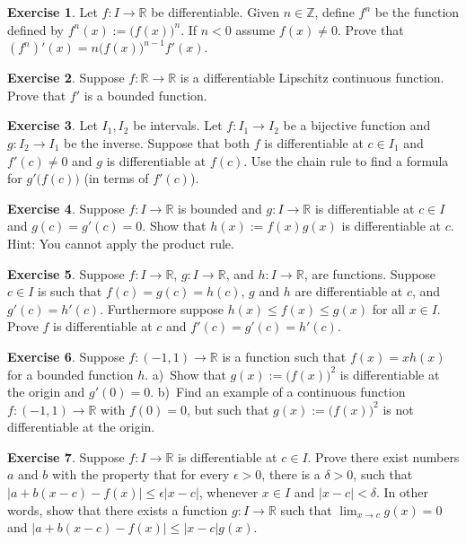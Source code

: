 \documentclass[12pt]{book}
\newcommand{\abs}[1]{\left\lvert {#1} \right\rvert}
\newcommand{\R}{{\mathbb{R}}}
\newcommand{\Z}{{\mathbb{Z}}}
\theoremstyle{plain}
\theoremstyle{remark}
\theoremstyle{definition}
\theoremstyle{exercise}
\newtheorem{exercise}{Exercise}[section]
\theoremstyle{example}
\begin{document}
\begin{exercise}
Let $f \colon I \to \R$ be differentiable.  Given $n \in \Z$, define $f^n$
be the function defined by $f^n(x) := {\bigl( f(x) \bigr)}^n$.  If
$n < 0$ assume $f(x) \not= 0$.  Prove that
$(f^n)'(x) = n {\bigl(f(x) \bigr)}^{n-1} f'(x)$.
\end{exercise}

\begin{exercise}
Suppose $f \colon \R \to \R$ is a differentiable
Lipschitz continuous function.
Prove that $f'$ is a bounded function.
\end{exercise}

\begin{exercise}
Let $I_1, I_2$ be intervals.
Let $f \colon I_1 \to I_2$ be a bijective function and $g \colon I_2 \to I_1$
be the inverse.  Suppose that both $f$ is differentiable at $c \in I_1$ and
$f'(c) \not=0$ and $g$ is differentiable at $f(c)$.  Use the chain rule
to find a formula for $g'\bigl(f(c)\bigr)$ (in terms of $f'(c)$).
\end{exercise}

\begin{exercise} \label{exercise:bndmuldiff}
Suppose $f \colon I \to \R$ is bounded and $g \colon I \to
\R$ is differentiable at $c \in I$ and $g(c) = g'(c) = 0$.  Show
that $h(x) := f(x) g(x)$ is differentiable at $c$.  Hint: You
cannot apply the product rule.
\end{exercise}

\begin{exercise} \label{exercise:diffsqueeze}
Suppose $f \colon I \to \R$, 
$g \colon I \to \R$, and
$h \colon I \to \R$, are functions.  Suppose $c \in I$ is such that
$f(c) = g(c) = h(c)$, $g$ and $h$ are differentiable at $c$,
and $g'(c) = h'(c)$.  Furthermore suppose $h(x) \leq f(x) \leq g(x)$ for
all $x \in I$.  Prove $f$ is differentiable at $c$ and $f'(c) = g'(c) =
h'(c)$.
\end{exercise}

\begin{exercise}
Suppose $f \colon (-1,1) \to \R$ is a function such that $f(x) = x h(x)$ for a bounded
function $h$.  a)~Show that $g(x) := {\bigl( f(x) \bigr)}^2$ is
differentiable at the origin and $g'(0) = 0$.  b)~Find an example of a
continuous function $f \colon (-1,1) \to \R$ with $f(0) = 0$, but such
that $g(x) := {\bigl( f(x) \bigr)}^2$ is not differentiable at the origin.
\end{exercise}

\begin{exercise}
Suppose $f \colon I \to \R$ is differentiable at $c \in I$.
Prove there exist numbers $a$ and $b$ with the property that
for every $\epsilon > 0$, there is a $\delta > 0$, such that
$\abs{a+b(x-c) - f(x)} \leq \epsilon \abs{x-c}$, whenever $x \in I$ and
$\abs{x-c} < \delta$.
In other words, show that
there exists a function $g \colon I \to \R$
such that $\lim_{x\to c} g(x) = 0$ and
$\abs{a+b(x-c) - f(x)} \leq \abs{x-c} g(x)$.
\end{exercise}
\end{document}
